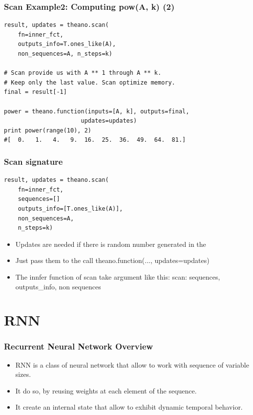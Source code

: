 \documentclass[utf8x,xcolor=pdftex,dvipsnames,table]{beamer}
\begin{document}
\begin{frame}[fragile]
  \frametitle{Scan Example2: Computing pow(A, k) (2)}

\begin{lstlisting}
result, updates = theano.scan(
    fn=inner_fct,
    outputs_info=T.ones_like(A),
    non_sequences=A, n_steps=k)

# Scan provide us with A ** 1 through A ** k.
# Keep only the last value. Scan optimize memory.
final = result[-1]

power = theano.function(inputs=[A, k], outputs=final,
                      updates=updates)
print power(range(10), 2)
#[  0.   1.   4.   9.  16.  25.  36.  49.  64.  81.]
\end{lstlisting}
\end{frame}

\begin{frame}[fragile]
  \frametitle{Scan signature}

\begin{lstlisting}
result, updates = theano.scan(
    fn=inner_fct,
    sequences=[]
    outputs_info=[T.ones_like(A)],
    non_sequences=A,
    n_steps=k)
\end{lstlisting}

\begin{itemize}
\item Updates are needed if there is random number generated in the
\item Just pass them to the call theano.function(..., updates=updates)
\item The innfer function of scan take argument like this:
   scan: sequences, outputs\_info, non sequences
\end{itemize}

\end{frame}


\section{RNN}
\begin{frame}
  \tableofcontents[currentsection]
\end{frame}

\begin{frame}
  \frametitle{Recurrent Neural Network Overview}
\begin{itemize}
\item RNN is a class of neural network that allow to work with sequence of variable sizes.
\item It do so, by reusing weights at each element of the sequence.
\item It create an internal state that allow to exhibit dynamic temporal behavior.
\end{itemize}
\end{frame}
\end{document}
